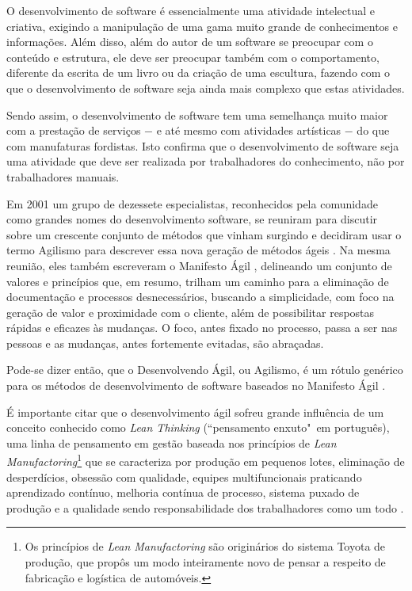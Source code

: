 O desenvolvimento de software é essencialmente uma atividade intelectual e criativa, exigindo a manipulação de uma gama muito grande de conhecimentos e informações. Além disso, além do autor de um software se preocupar com o conteúdo e estrutura, ele deve ser preocupar também com o comportamento, diferente da escrita de um livro ou da criação de uma escultura, fazendo com o que o desenvolvimento de software seja ainda mais complexo que estas atividades.

Sendo assim, o desenvolvimento de software tem uma semelhança muito maior com a prestação de serviços $-$ e até mesmo com atividades artísticas $-$ do que com manufaturas fordistas. Isto confirma que o desenvolvimento de software seja uma atividade que deve ser realizada por trabalhadores do conhecimento, não por trabalhadores manuais.

Em 2001 um grupo de dezessete especialistas, reconhecidos pela comunidade como grandes nomes do desenvolvimento software, se reuniram para discutir sobre um crescente conjunto de métodos que vinham surgindo e decidiram usar o termo Agilismo para descrever essa nova geração de métodos ágeis \cite{AgileStory}. Na mesma reunião, eles também escreveram o Manifesto Ágil \cite{AgileManifesto}, delineando um conjunto de valores e princípios que, em resumo, trilham um caminho para a eliminação de documentação e processos desnecessários, buscando a simplicidade, com foco na geração de valor e proximidade com o cliente, além de possibilitar respostas rápidas e eficazes às mudanças. O foco, antes fixado no processo, passa a ser nas pessoas e as mudanças, antes fortemente evitadas, são abraçadas.

Pode-se dizer então, que o Desenvolvendo Ágil, ou Agilismo, é um rótulo genérico para os métodos de desenvolvimento de software baseados no Manifesto Ágil \cite{BDDRodrigo}.

É importante citar que o desenvolvimento ágil sofreu grande influência de um conceito conhecido como \textit{Lean Thinking} (``pensamento enxuto"\ em português), uma linha de pensamento em gestão baseada nos princípios de \textit{Lean Manufactoring}\footnote{Os princípios de \textit{Lean Manufactoring} são originários do sistema Toyota de produção, que propôs um modo inteiramente novo de pensar a respeito de fabricação e logística de automóveis.} que se caracteriza por produção em pequenos lotes, eliminação de desperdícios, obsessão com qualidade, equipes multifuncionais praticando aprendizado contínuo, melhoria contínua de processo, sistema puxado de produção e a qualidade sendo responsabilidade dos trabalhadores como um todo \cite{BDDRodrigo}.

